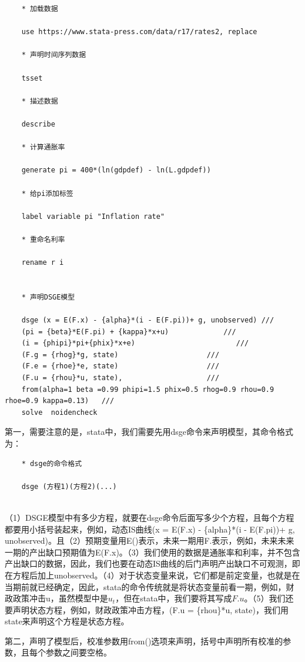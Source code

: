 \documentclass[cn,12pt,math=newtx,citestyle=gb7714-2015,bibstyle=gb7714-2015]{elegantbook}
\begin{document}
\begin{lstlisting}
	* 加载数据
	
	use https://www.stata-press.com/data/r17/rates2, replace
	
	* 声明时间序列数据
	
	tsset
	
	* 描述数据
	
	describe
	
	* 计算通胀率
	
	generate pi = 400*(ln(gdpdef) - ln(L.gdpdef))
	
	* 给pi添加标签
	
	label variable pi "Inflation rate"
	
	* 重命名利率
	
	rename r i
	
	
	* 声明DSGE模型
	
	dsge (x = E(F.x) - {alpha}*(i - E(F.pi))+ g, unobserved) ///
	(pi = {beta}*E(F.pi) + {kappa}*x+u)             ///
	(i = {phipi}*pi+{phix}*x+e)                        ///
	(F.g = {rhog}*g, state)                     ///
	(F.e = {rhoe}*e, state)                     ///
	(F.u = {rhou}*u, state),                    ///
	from(alpha=1 beta =0.99 phipi=1.5 phix=0.5 rhog=0.9 rhou=0.9 rhoe=0.9 kappa=0.13)   /// 
	solve  noidencheck
\end{lstlisting}

第一，需要注意的是，stata中，我们需要先用dsge命令来声明模型，其命令格式为：

\begin{lstlisting}
	* dsge的命令格式
	
	dsge (方程1)(方程2)(...)     
	
\end{lstlisting}

（1）DSGE模型中有多少方程，就要在dsge命令后面写多少个方程，且每个方程都要用小括号装起来，例如，动态IS曲线(x = E(F.x) - \{alpha\}*(i - E(F.pi))+ g, unobserved)。且（2）预期变量用E()表示，未来一期用F.表示，例如，未来未来一期的产出缺口预期值为E(F.x)。（3）我们使用的数据是通胀率和利率，并不包含产出缺口的数据，因此，我们也要在动态IS曲线的后门声明产出缺口不可观测，即在方程后加上unobserved。（4）对于状态变量来说，它们都是前定变量，也就是在当期前就已经确定，因此，stata的命令传统就是将状态变量前看一期，例如，财政政策冲击u，虽然模型中是$u_t$，但在stata中，我们要将其写成$F.u$。（5）我们还要声明状态方程，例如，财政政策冲击方程，(F.u = \{rhou\}*u, state)，我们用state来声明这个方程是状态方程。

第二，声明了模型后，校准参数用from()选项来声明，括号中声明所有校准的参数，且每个参数之间要空格。
\end{document}
